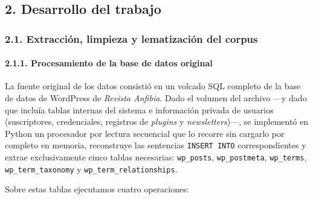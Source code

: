 \documentclass[
]{article}
\begin{document}
\subsection{2. Desarrollo del trabajo}\label{desarrollo-del-trabajo}

\subsubsection{2.1. Extracción, limpieza y lematización del
corpus}\label{extracciuxf3n-limpieza-y-lematizaciuxf3n-del-corpus}

\paragraph{2.1.1. Procesamiento de la base de datos
original}\label{procesamiento-de-la-base-de-datos-original}

La fuente original de los datos consistió en un volcado SQL completo de
la base de datos de WordPress de \emph{Revista Anfibia}. Dado el volumen
del archivo ---y dado que incluía tablas internas del sistema e
información privada de usuarios (suscriptores, credenciales, registros
de \emph{plugins} y \emph{newsletters})---, se implementó en Python un
procesador por lectura secuencial que lo recorre sin cargarlo por
completo en memoria, reconstruye las sentencias \texttt{INSERT\ INTO}
correspondientes y extrae exclusivamente cinco tablas necesarias:
\texttt{wp\_posts}, \texttt{wp\_postmeta}, \texttt{wp\_terms},
\texttt{wp\_term\_taxonomy} y \texttt{wp\_term\_relationships}.

Sobre estas tablas ejecutamos cuatro operaciones:
\end{document}
